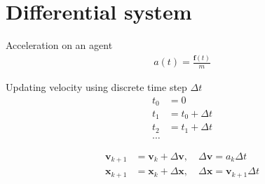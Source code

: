 \section{Differential system}
Acceleration on an agent
\begin{align}
a(t) = \frac{\mathbf{f}(t)}{m}
\end{align}

Updating velocity using discrete time step $ \Delta t $
\begin{align}
t_{0} &= 0 \\
t_{1} &= t_{0} + \Delta t \\
t_{2} &= t_{1} + \Delta t \\
\ldots
\end{align}

\begin{align}
\mathbf{v}_{k+1} &= \mathbf{v}_{k} + \Delta \mathbf{v}, \quad \Delta \mathbf{v} = a_{k} \Delta t \\
\mathbf{x}_{k+1} &= \mathbf{x}_{k} + \Delta \mathbf{x}, \quad \Delta \mathbf{x} = \mathbf{v}_{k+1} \Delta t
\end{align}
